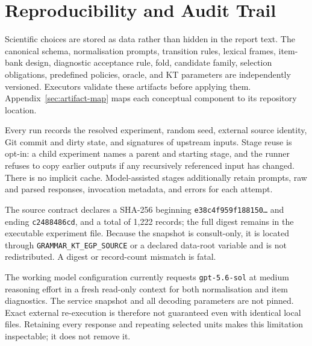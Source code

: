 \section{Reproducibility and Audit Trail}
\label{sec:reproducibility}

Scientific choices are stored as data rather than hidden in the report text.
The canonical schema, normalisation prompts, transition rules, lexical frames,
item-bank design, diagnostic acceptance rule, fold, candidate family,
selection obligations, predefined policies, oracle, and KT parameters are
independently versioned.  Executors validate these artifacts before applying
them.  Appendix~\ref{sec:artifact-map} maps each conceptual component to its
repository location.

Every run records the resolved experiment, random seed, external source
identity, Git commit and dirty state, and signatures of upstream inputs.  Stage
reuse is opt-in: a child experiment names a parent and starting stage, and the
runner refuses to copy earlier outputs if any recursively referenced input has
changed.  There is no implicit cache.  Model-assisted stages additionally
retain prompts, raw and parsed responses, invocation metadata, and errors for
each attempt.

The source contract declares a SHA-256 beginning
\texttt{e38c4f959f188150\ldots} and ending \texttt{c2488486cd}, and a total of
1,222 records; the full digest remains in the executable experiment file.
Because the snapshot is consult-only, it is located through
\texttt{GRAMMAR\_KT\_EGP\_SOURCE} or a declared data-root variable and is not
redistributed.  A digest or record-count mismatch is fatal.

The working model configuration currently requests
\texttt{gpt-5.6-sol} at medium reasoning effort in a fresh read-only context
for both normalisation and item diagnostics.  The service snapshot and all
decoding parameters are not pinned.  Exact external re-execution is therefore
not guaranteed even with identical local files.  Retaining every response and
repeating selected units makes this limitation inspectable; it does not remove
it.

